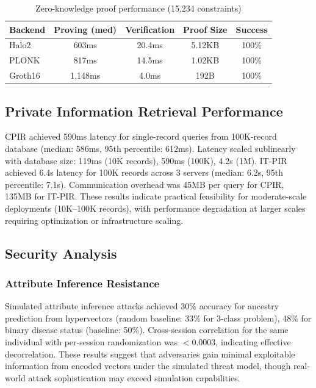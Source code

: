\documentclass[11pt,letterpaper]{article}
\begin{document}
\begin{table}[!ht]
\centering
\caption{Zero-knowledge proof performance (15,234 constraints)}
\label{tab:zk}
\begin{tabular}{lcccc}
\toprule
\textbf{Backend} & \textbf{Proving (med)} & \textbf{Verification} & \textbf{Proof Size} & \textbf{Success} \\
\midrule
Halo2 & 603ms & 20.4ms & 5.12KB & 100\% \\
PLONK & 817ms & 14.5ms & 1.02KB & 100\% \\
Groth16 & 1,148ms & 4.0ms & 192B & 100\% \\
\bottomrule
\end{tabular}
\end{table}

\subsection{Private Information Retrieval Performance}

CPIR achieved 590ms latency for single-record queries from 100K-record database (median: 586ms, 95th percentile: 612ms). Latency scaled sublinearly with database size: 119ms (10K records), 590ms (100K), 4.2s (1M). IT-PIR achieved 6.4s latency for 100K records across 3 servers (median: 6.2s, 95th percentile: 7.1s). Communication overhead was 45MB per query for CPIR, 135MB for IT-PIR. These results indicate practical feasibility for moderate-scale deployments (10K--100K records), with performance degradation at larger scales requiring optimization or infrastructure scaling.

\subsection{Security Analysis}

\subsubsection{Attribute Inference Resistance}

Simulated attribute inference attacks achieved 30\% accuracy for ancestry prediction from hypervectors (random baseline: 33\% for 3-class problem), 48\% for binary disease status (baseline: 50\%). Cross-session correlation for the same individual with per-session randomization was $< 0.0003$, indicating effective decorrelation. These results suggest that adversaries gain minimal exploitable information from encoded vectors under the simulated threat model, though real-world attack sophistication may exceed simulation capabilities.
\end{document}
